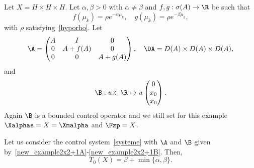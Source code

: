 Let $X=H\times H\times H$. Let $\alpha,\beta>0$ with $\alpha\neq\beta$ and $f, g : \sigma(A) \to \R$ be such that
\[
f(\mu_k) = \rho e^{-\alpha \mu_k},
\quad g(\mu_k) = \rho e^{-\beta \mu_k},
\]
with $\rho$ satisfying~\eqref{hyporho}. Let
\begin{equation}\label{new_example2x2+1A}
\A=
\begin{pmatrix} A & I & 0 \\ 0 & A+f(A) & 0 \\ 0 & 0 &A+g(A)
\end{pmatrix},
\quad
\DA=D(A)\times D(A)\times D(A),
\end{equation}
and
\begin{equation}\label{new_example2x2+1B}
\B : u \in \R \mapsto u
\begin{pmatrix} 0 \\ x_0 \\ x_0
\end{pmatrix}.
\end{equation}
Again $\B$ is a bounded control operator and we still set for this example $\Xalphas = X\linebreak=\Xmalpha$ and $\Fzp=X$.

\begin{prop}\label{Prop:Academique3}
Let us consider the control system~\eqref{systeme} with $\A$ and $\B$ given by~\eqref{new_example2x2+1A}-\eqref{new_example2x2+1B}. Then,
\[
T_0(X) = \beta + \min\{ \alpha, \beta \}.
\]
\end{prop}

